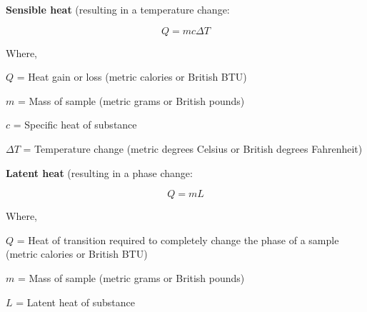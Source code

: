 \vskip 30pt

\noindent
{\bf Sensible heat} (resulting in a temperature change:

$$Q = m c \Delta T$$

\noindent
Where,

$Q$ = Heat gain or loss (metric calories or British BTU)

$m$ = Mass of sample (metric grams or British pounds)

$c$ = Specific heat of substance

$\Delta T$ = Temperature change (metric degrees Celsius or British degrees Fahrenheit)


\vskip 30pt


\noindent
{\bf Latent heat} (resulting in a phase change:

$$Q = m L$$

\noindent
Where,

$Q$ = Heat of transition required to completely change the phase of a sample (metric calories or British BTU)

$m$ = Mass of sample (metric grams or British pounds)

$L$ = Latent heat of substance

\vskip 10pt












